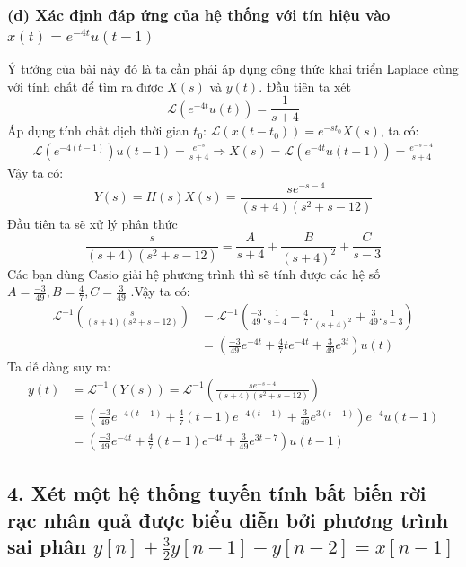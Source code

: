 \documentclass{article}
\begin{document}
\subsubsection*{(d) Xác định đáp ứng của hệ thống với tín hiệu vào $x(t)=e^{-4t}u(t-1)$}
Ý tưởng của bài này đó là ta cần phải áp dụng công thức khai triển Laplace cùng với tính chất để tìm ra được $X(s)$ và $y(t)$. Đầu tiên ta xét 
$$\mathscr{L}(e^{-4t}u(t))=\frac{1}{s+4}$$
Áp dụng tính chất dịch thời gian $t_{0}$: $\mathscr{L}(x(t-t_{0}))=e^{-st_{0}}X(s)$, ta có:
\begin{equation*}
\begin{split}
\mathscr{L}(e^{-4(t-1)})u(t-1)=\frac{e^{-s}}{s+4}\Rightarrow X(s)=\mathscr{L}(e^{-4t}u(t-1))=\frac{e^{-s-4}}{s+4}
\end{split}
\end{equation*}
Vậy ta có:
$$Y(s)=H(s)X(s)=\frac{se^{-s-4}}{(s+4)(s^2+s-12)}$$
Đầu tiên ta sẽ xử lý phân thức 
$$\frac{s}{(s+4)(s^2+s-12)}=\frac{A}{s+4}+\frac{B}{(s+4)^2}+\frac{C}{s-3}$$
Các bạn dùng Casio giải hệ phương trình thì sẽ tính được các hệ số $A=\frac{-3}{49}, B=\frac{4}{7}, C=\frac{3}{49}$
.Vậy ta có:
\begin{equation*}
\begin{split}
\mathscr{L}^{-1}\left(\frac{s}{(s+4)(s^2+s-12)}\right)&=\mathscr{L}^{-1}\left(\frac{-3}{49}.\frac{1}{s+4}+\frac{4}{7}.\frac{1}{(s+4)^2}+\frac{3}{49}.\frac{1}{s-3}\right)\\
&=\left(\frac{-3}{49}e^{-4t}+\frac{4}{7}te^{-4t}+\frac{3}{49}e^{3t}\right)u(t)
\end{split}
\end{equation*}
Ta dễ dàng suy ra:
\begin{equation*}
\begin{split}
y(t)&=\mathscr{L}^{-1}(Y(s))=\mathscr{L}^{-1}\left(\frac{se^{-s-4}}{(s+4)(s^2+s-12)}\right)\\&=\left(\frac{-3}{49}e^{-4(t-1)}+\frac{4}{7}(t-1)e^{-4(t-1)}+\frac{3}{49}e^{3(t-1)}\right)e^{-4}u(t-1)\\&=\left(\frac{-3}{49}e^{-4t}+\frac{4}{7}(t-1)e^{-4t}+\frac{3}{49}e^{3t-7}\right)u(t-1)
\end{split}
\end{equation*}
\subsection*{4. Xét một hệ thống tuyến tính bất biến rời rạc nhân quả được biểu diễn bởi phương trình sai phân $y[n]+\frac{3}{2}y[n-1]-y[n-2]=x[n-1]$}
\end{document}
